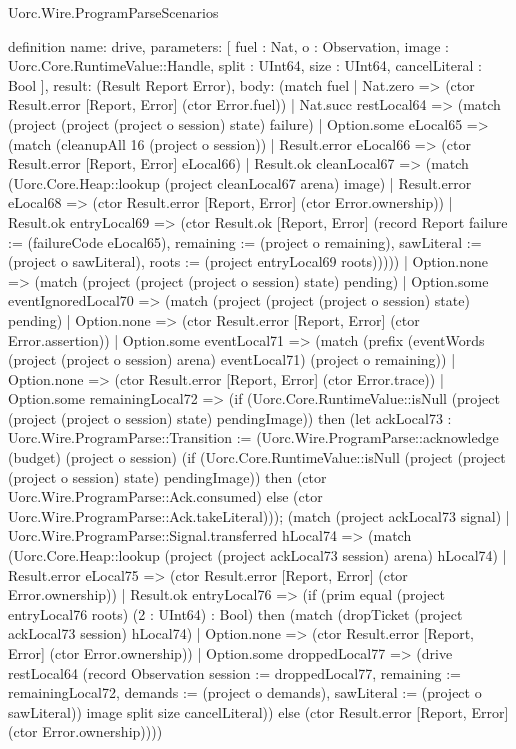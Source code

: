 \begin{lexlean}{Uorc.Wire.ProgramParseScenarios}
\begin{semanticmodule}
definition{
  name: drive,
  parameters: [
    fuel : Nat,
    o : Observation,
    image : Uorc.Core.RuntimeValue::Handle,
    split : UInt64,
    size : UInt64,
    cancelLiteral : Bool
  ],
  result: (Result Report Error),
  body: (match fuel
    | Nat.zero => (ctor Result.error [Report, Error] (ctor Error.fuel))
    | Nat.succ restLocal64 => (match (project (project (project o session) state) failure)
      | Option.some eLocal65 => (match (cleanupAll 16 (project o session))
        | Result.error eLocal66 => (ctor Result.error [Report, Error] eLocal66)
        | Result.ok cleanLocal67 => (match (Uorc.Core.Heap::lookup (project cleanLocal67 arena) image)
          | Result.error eLocal68 => (ctor Result.error [Report, Error] (ctor Error.ownership))
          | Result.ok entryLocal69 => (ctor Result.ok [Report, Error] (record Report {failure := (failureCode eLocal65), remaining := (project o remaining), sawLiteral := (project o sawLiteral), roots := (project entryLocal69 roots)}))))
      | Option.none => (match (project (project (project o session) state) pending)
        | Option.some eventIgnoredLocal70 => (match (project (project (project o session) state) pending)
          | Option.none => (ctor Result.error [Report, Error] (ctor Error.assertion))
          | Option.some eventLocal71 => (match (prefix (eventWords (project (project o session) arena) eventLocal71) (project o remaining))
            | Option.none => (ctor Result.error [Report, Error] (ctor Error.trace))
            | Option.some remainingLocal72 => (if (Uorc.Core.RuntimeValue::isNull (project (project (project o session) state) pendingImage)) then (let ackLocal73 : Uorc.Wire.ProgramParse::Transition := (Uorc.Wire.ProgramParse::acknowledge (budget) (project o session) (if (Uorc.Core.RuntimeValue::isNull (project (project (project o session) state) pendingImage)) then (ctor Uorc.Wire.ProgramParse::Ack.consumed) else (ctor Uorc.Wire.ProgramParse::Ack.takeLiteral))); (match (project ackLocal73 signal)
              | Uorc.Wire.ProgramParse::Signal.transferred hLocal74 => (match (Uorc.Core.Heap::lookup (project (project ackLocal73 session) arena) hLocal74)
                | Result.error eLocal75 => (ctor Result.error [Report, Error] (ctor Error.ownership))
                | Result.ok entryLocal76 => (if (prim equal (project entryLocal76 roots) (2 : UInt64) : Bool) then (match (dropTicket (project ackLocal73 session) hLocal74)
                  | Option.none => (ctor Result.error [Report, Error] (ctor Error.ownership))
                  | Option.some droppedLocal77 => (drive restLocal64 (record Observation {session := droppedLocal77, remaining := remainingLocal72, demands := (project o demands), sawLiteral := (project o sawLiteral)}) image split size cancelLiteral)) else (ctor Result.error [Report, Error] (ctor Error.ownership))))
}
\end{semanticmodule}
\end{lexlean}
